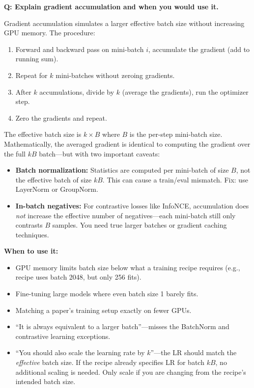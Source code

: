 \begin{interviewq}
\textbf{Q: Explain gradient accumulation and when you would use it.}

 \quad {} \quad \badgefreq{\freqmed}

\stronganswer

Gradient accumulation simulates a larger effective batch size without increasing GPU memory. The procedure:
\begin{enumerate}
    \item Forward and backward pass on mini-batch $i$, accumulate the gradient (add to running sum).
    \item Repeat for $k$ mini-batches without zeroing gradients.
    \item After $k$ accumulations, divide by $k$ (average the gradients), run the optimizer step.
    \item Zero the gradients and repeat.
\end{enumerate}

The effective batch size is $k \times B$ where $B$ is the per-step mini-batch size. Mathematically, the averaged gradient is identical to computing the gradient over the full $kB$ batch---but with two important caveats:
\begin{itemize}
    \item \textbf{Batch normalization:} Statistics are computed per mini-batch of size $B$, not the effective batch of size $kB$. This can cause a train/eval mismatch. Fix: use LayerNorm or GroupNorm.
    \item \textbf{In-batch negatives:} For contrastive losses like InfoNCE, accumulation does \textit{not} increase the effective number of negatives---each mini-batch still only contrasts $B$ samples. You need true larger batches or gradient caching techniques.
\end{itemize}

\textbf{When to use it:}
\begin{itemize}
    \item GPU memory limits batch size below what a training recipe requires (e.g., recipe uses batch 2048, but only 256 fits).
    \item Fine-tuning large models where even batch size 1 barely fits.
    \item Matching a paper's training setup exactly on fewer GPUs.
\end{itemize}

\redflags
\begin{itemize}
    \item ``It is always equivalent to a larger batch''---misses the BatchNorm and contrastive learning exceptions.
    \item ``You should also scale the learning rate by $k$''---the LR should match the \textit{effective} batch size. If the recipe already specifies LR for batch $kB$, no additional scaling is needed. Only scale if you are changing from the recipe's intended batch size.
\end{itemize}


\end{interviewq}
